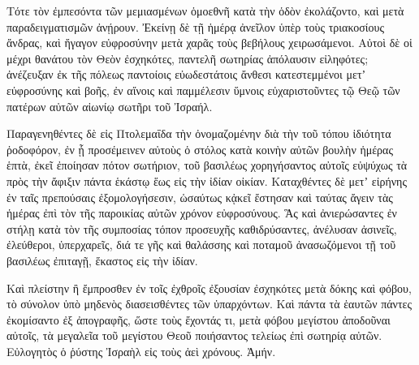 {\par }{\PP {}Τότε τὸν ἐμπεσόντα τῶν μεμιασμένων ὁμοεθνῆ κατὰ τὴν ὁδὸν ἐκολάζοντο, καὶ μετὰ παραδειγματισμῶν ἀνῄρουν.
Ἐκείνῃ δὲ τῇ ἡμέρᾳ ἀνεῖλον ὑπὲρ τοὺς τριακοσίους ἄνδρας, καὶ ἤγαγον εὐφροσύνην μετὰ χαρᾶς τοὺς βεβήλους χειρωσάμενοι.
Αὐτοὶ δὲ οἱ μέχρι θανάτου τὸν Θεὸν ἐσχηκότες, παντελῆ σωτηρίας ἀπόλαυσιν εἰληφότες; ἀνέζευξαν ἐκ τῆς πόλεως παντοίοις εὐωδεστάτοις ἄνθεσι κατεστεμμένοι μετʼ εὐφροσύνης καὶ βοῆς, ἐν αἴνοις καὶ παμμέλεσιν ὕμνοις εὐχαριστοῦντες τῷ Θεῷ τῶν πατέρων αὐτῶν αἰωνίῳ σωτῆρι τοῦ Ἰσραήλ.
\par }{\PP {}Παραγενηθέντες δὲ εἰς Πτολεμαΐδα τὴν ὀνομαζομένην διὰ τὴν τοῦ τόπου ἰδιότητα ῥοδοφόρον, ἐν ᾗ προσέμεινεν αὐτοὺς ὁ στόλος κατὰ κοινὴν αὐτῶν βουλὴν ἡμέρας ἑπτὰ,
ἐκεῖ ἐποίησαν πότον σωτήριον, τοῦ βασιλέως χορηγήσαντος αὐτοῖς εὐψύχως τὰ πρὸς τὴν ἄφιξιν πάντα ἑκάστῳ ἕως εἰς τὴν ἰδίαν οἰκίαν.
Καταχθέντες δὲ μετʼ εἰρήνης ἐν ταῖς πρεπούσαις ἐξομολογήσεσιν, ὡσαύτως κᾀκεῖ ἔστησαν καὶ ταύτας ἄγειν τὰς ἡμέρας ἐπὶ τὸν τῆς παροικίας αὐτῶν χρόνον εὐφροσύνους.
Ἃς καὶ ἀνιερώσαντες ἐν στήλῃ κατὰ τὸν τῆς συμποσίας τόπον προσευχῆς καθιδρύσαντες, ἀνέλυσαν ἀσινεῖς, ἐλεύθεροι, ὑπερχαρεῖς, διά τε γῆς καὶ θαλάσσης καὶ ποταμοῦ ἀνασωζόμενοι τῇ τοῦ βασιλέως ἐπιταγῇ, ἕκαστος εἰς τὴν ἰδίαν.
\par }{\PP {}Καὶ πλείστην ἢ ἔμπροσθεν ἐν τοῖς ἐχθροῖς ἐξουσίαν ἐσχηκότες μετὰ δόκης καὶ φόβου, τὸ σύνολον ὑπὸ μηδενὸς διασεισθέντες τῶν ὑπαρχόντων.
Καὶ πάντα τὰ ἑαυτῶν πάντες ἐκομίσαντο ἐξ ἀπογραφῆς, ὥστε τοὺς ἔχοντάς τι, μετὰ φόβου μεγίστου ἀποδοῦναι αὐτοῖς, τὰ μεγαλεῖα τοῦ μεγίστου Θεοῦ ποιήσαντος τελείως ἐπὶ σωτηρίᾳ αὐτῶν.
Εὐλογητὸς ὁ ῥύστης Ἰσραὴλ εἰς τοὺς ἀεὶ χρόνους. Ἀμήν.
\par }